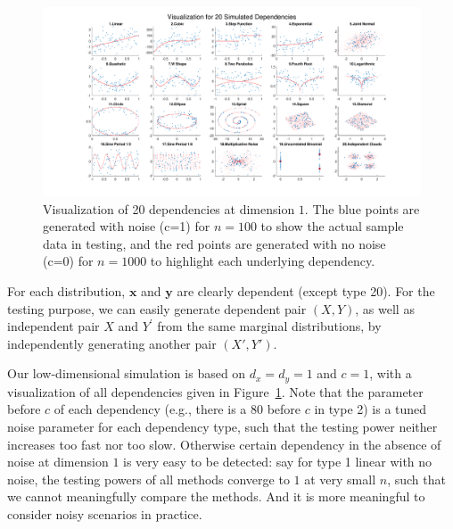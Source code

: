 \documentclass[11pt]{article}
\providecommand{\mb}[1]{\boldsymbol{#1}}
\newcommand{\jv}[1]{{\color{red}{#1}}}
\newcommand{\cs}[1]{{\color{blue}{#1}}}
\begin{document}
\begin{figure}[htbp]
\includegraphics[trim={5cm 0 3.5cm 0},clip, width=1.0\textwidth]{../Figures/Fig0}
\caption{Visualization of 20 dependencies at dimension $1$. The blue points are generated with noise (c=1) for $n=100$ to show the actual sample data in testing, and the red points are generated with no noise (c=0) for $n=1000$ to highlight each underlying dependency.
}
\label{fig0}
\end{figure}



For each distribution, $\mb{x}$ and $\mb{y}$ are clearly dependent (except type 20). For the testing purpose, we can easily generate dependent pair $(X, Y)$, as well as independent pair $X$ and $Y^{'}$ from the same marginal distributions, by independently generating another pair $(X',Y')$.
\jv{explain how. most you set $w$ to zero, but not all.}
\cs{Explained above}
\jv{i don't see where.}
\cs{maybe I didn't get your question; let us chat on this.}

Our low-dimensional simulation is based on $d_{x}=d_{y}=1$ and $c=1$, with a visualization of all dependencies given in Figure~\ref{fig0}. Note that the parameter before $c$ of each dependency (e.g., there is a $80$ before $c$ in type 2) is a tuned noise parameter for each dependency type, such that the testing power neither increases too fast nor too slow. Otherwise certain dependency in the absence of noise at dimension $1$ is very easy to be detected: say for type 1 linear with no noise, the testing powers of all methods converge to $1$ at very small $n$, such that we cannot meaningfully compare the methods. And it is more meaningful to consider noisy scenarios in practice. \jv{what is the constant ``before $c$''?}
\cs{say for type 2 cubic, there is a 80 before $c$...}
\jv{oh, ok, specify precisely which equations that refers to.}
\cs{ok, I have put an example above for this constant.}
\end{document}

